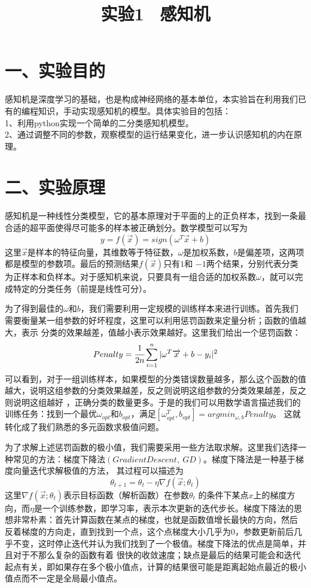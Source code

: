 \documentclass{article}
\begin{document}
\title*{\Huge \centering \vfill \textbf{实验1 \ 感知机}}
\section*{\LARGE 一、实验目的}
感知机是深度学习的基础，也是构成神经网络的基本单位，本实验旨在利用我们已有的编程知识，手动实现感知机的模型。具体实验目的包括：\\
1、利用python实现一个简单的二分类感知机模型。\\
2、通过调整不同的参数，观察模型的运行结果变化，进一步认识感知机的内在原理。


\section*{\LARGE 二、实验原理}
感知机是一种线性分类模型，它的基本原理对于平面的上的正负样本，找到一条最合适的超平面使得尽可能多的样本被正确划分。数学模型可以写为
$$y=f(\overrightarrow{x})=sign(\omega^T\overrightarrow{x}+b)$$
这里$\overrightarrow{x} $是样本的特征向量，其维数等于特征数，$\omega$是加权系数，$b$是偏差项，这两项都是模型的参数项。最后的预测结果$f(\overrightarrow{x} )$只有$1$和
$-1$两个结果，分别代表分类为正样本和负样本。对于感知机来说，只要具有一组合适的加权系数$\omega$，就可以完成特定的分类任务（前提是线性可分）。


为了得到最佳的$\omega$和$b$，我们需要利用一定规模的训练样本来进行训练。首先我们需要衡量某一组参数的好坏程度，这里可以利用惩罚函数来定量分析；函数的值越大，表示
分类的效果越差，值越小表示效果越好。这里我们给出一个惩罚函数：
$$Penalty=\cfrac{1}{2n}\sum_{i = 1}^{n} |\omega^T\overrightarrow{x}+b-y_i|^2$$
可以看到，对于一组训练样本，如果模型的分类错误数量越多，那么这个函数的值越大，说明这组参数的分类效果越差，反之则说明这组参数的分类效果越差，反之则说明这组越好
，正确分类的数量更多。于是的我们可以用数学语言描述我们的训练任务：找到一个最优$\omega_{opt}$和$b_{opt}$，满足$[\omega_{opt}^T,b_{opt}]=argmin_{\omega,b}Penalty$。
这就转化成了我们熟悉的多元函数求极值问题。


为了求解上述惩罚函数的极小值，我们需要采用一些方法取求解。这里我们选择一种常见的方法：梯度下降法$(Gradient Descent,\ GD)$。梯度下降法是一种基于梯度向量迭代求解极值的方法，
其过程可以描述为$$\theta_{t+1}=\theta_{t}-\eta\nabla f(\overrightarrow{x};\theta_t )$$这里$\nabla f(\overrightarrow{x};\theta_t )$表示目标函数（解析函数）在参数$\theta_t$
的条件下某点$x$上的梯度方向，而$\eta$是一个训练参数，即学习率，表示本次更新的迭代步长。梯度下降法的思想非常朴素：首先计算函数在某点的梯度，也就是函数值增长最快的方向，然后
反着梯度的方向走，直到找到一个点，这个点梯度大小几乎为$0$，参数更新前后几乎不变，这时停止迭代并认为我们找到了一个极值。梯度下降法的优点是简单，并且对于不那么复杂的函数有着
很快的收敛速度；缺点是最后的结果可能会和迭代起点有关，即如果存在多个极小值点，计算的结果很可能是距离起始点最近的极小值点而不一定是全局最小值点。
\end{document}
